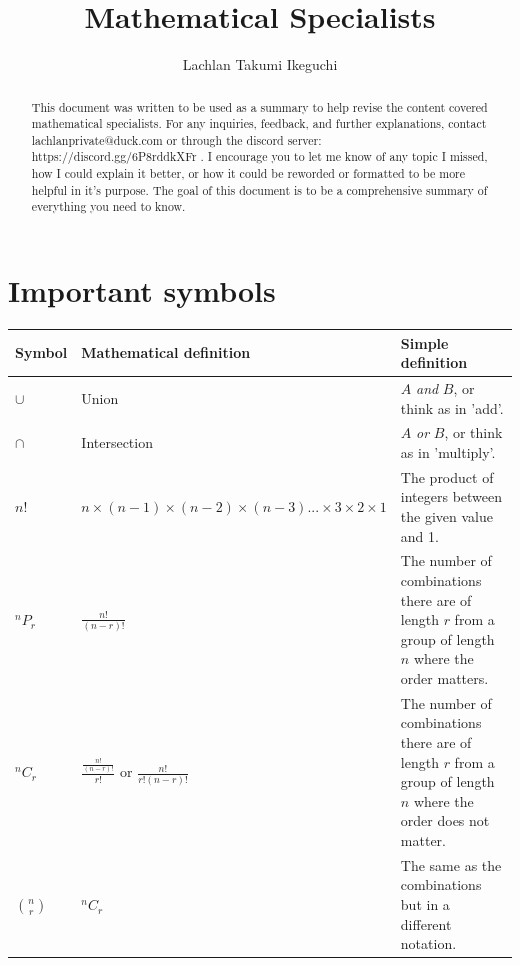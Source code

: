 \documentclass[a4paper,10pt]{report}
\title{Mathematical Specialists}
\author{Lachlan Takumi Ikeguchi}
\begin{document}
\maketitle
\tableofcontents

\begin{abstract}
	This document was written to be used as a summary to help revise the content covered mathematical specialists.  For any inquiries, feedback, and further explanations, contact lachlanprivate@duck.com or through the discord server: https://discord.gg/6P8rddkXFr .  I encourage you to let me know of any topic I missed, how I could explain it better, or how it could be reworded or formatted to be more helpful in it's purpose.  The goal of this document is to be a comprehensive summary of everything you need to know.
\end{abstract}

\section{Important symbols}
\begin{center}
	\begin{tabular}{l|lp{6cm}}
		Symbol         & Mathematical definition                                                  & Simple definition                                                                                              \\ \hline
		$\cup$         & Union                                                                    & $A$ \emph{and} $B$, or think as in 'add'.                                                                      \\
		$\cap$         & Intersection                                                             & $A$ \emph{or} $B$, or think as in 'multiply'.                                                                  \\
		$n!$           & $n \times (n-1) \times (n-2) \times (n-3)... \times 3 \times 2 \times 1$ & The product of integers between the given value and 1.                                                         \\
		$^nP_r$        & $\frac{n!}{(n-r)!}$                                                      & The number of combinations there are of length $r$ from a group of length $n$ where the order matters.         \\
		$^nC_r$        & $\frac{\frac{n!}{(n-r)!}}{r!}$ or $\frac{n!}{r!(n - r)!}$                & The number of combinations there are of length $r$ from a group of length $n$ where the order does not matter. \\
		$\binom{n}{r}$ & $^nC_r$                                                                  & The same as the combinations but in a different notation.
	\end{tabular}
\end{center}
\end{document}

